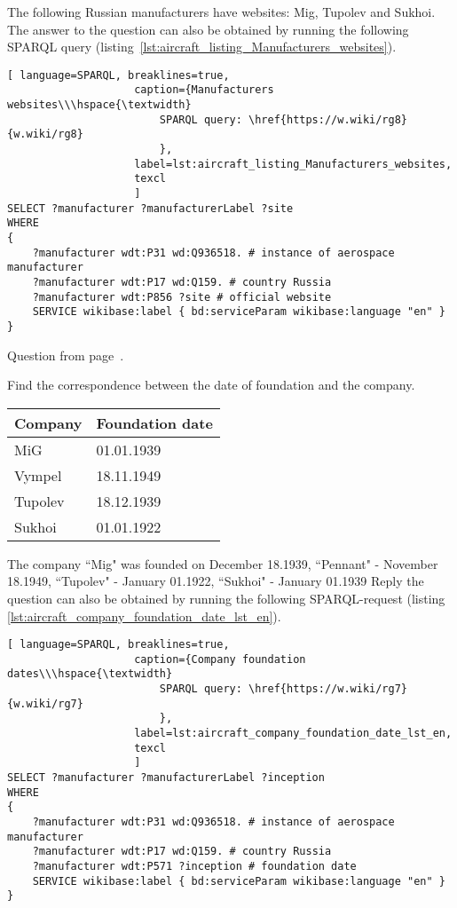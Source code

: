The following Russian manufacturers have websites: Mig, Tupolev and Sukhoi. The answer to the question can also be obtained by running the following SPARQL query (listing~\ref{lst:aircraft_listing_Manufacturers_websites}). 
    
\begin{lstlisting}[ language=SPARQL, breaklines=true, 
                    caption={Manufacturers websites\\\hspace{\textwidth}
                        SPARQL query: \href{https://w.wiki/rg8}{w.wiki/rg8}
                        },
                    label=lst:aircraft_listing_Manufacturers_websites,
                    texcl 
                    ]
SELECT ?manufacturer ?manufacturerLabel ?site
WHERE
{
    ?manufacturer wdt:P31 wd:Q936518. # instance of aerospace manufacturer
  	?manufacturer wdt:P17 wd:Q159. # country Russia
  	?manufacturer wdt:P856 ?site # official website
    SERVICE wikibase:label { bd:serviceParam wikibase:language "en" }
}
\end{lstlisting}

Question from page~\pageref{question:aircraft_manufacturers_en}.


\begin{exercise}%
    \label{answer:aircraft_answer_2}
Find the correspondence between the date of foundation and the company.
\\
\begin{tabular}{ l | l }
Company & Foundation date \\ \hline
MiG & 01.01.1939 \\
Vympel & 18.11.1949 \\
Tupolev & 18.12.1939 \\
Sukhoi & 01.01.1922 \\
\end{tabular}
\end{exercise}

The company ``Mig" was founded on December 18.1939, ``Pennant" - November 18.1949, ``Tupolev" - January 01.1922, ``Sukhoi" - January 01.1939 Reply the question can also be obtained by running the following SPARQL-request (listing \ref{lst:aircraft_company_foundation_date_lst_en}). 
       
\begin{lstlisting}[ language=SPARQL, breaklines=true, 
                    caption={Company foundation dates\\\hspace{\textwidth}
                        SPARQL query: \href{https://w.wiki/rg7}{w.wiki/rg7}
                        },
                    label=lst:aircraft_company_foundation_date_lst_en,
                    texcl 
                    ]
SELECT ?manufacturer ?manufacturerLabel ?inception
WHERE
{
    ?manufacturer wdt:P31 wd:Q936518. # instance of aerospace manufacturer
  	?manufacturer wdt:P17 wd:Q159. # country Russia
  	?manufacturer wdt:P571 ?inception # foundation date
    SERVICE wikibase:label { bd:serviceParam wikibase:language "en" }
}
\end{lstlisting}

